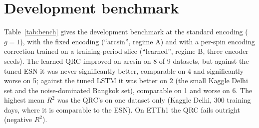 \documentclass[aps,prresearch,preprint,superscriptaddress,amsmath,amssymb,floatfix]{revtex4-2}
\begin{document}
\section{Development benchmark}\label{sec:bench}
Table~\ref{tab:bench} gives the development benchmark at the standard encoding
($g=1$), with the fixed encoding (``arcsin'', regime A) and with a per-spin encoding
correction trained on a training-period slice (``learned'', regime B, three encoder
seeds). The learned QRC improved on arcsin on 8 of 9 datasets, but against the tuned
ESN it was never significantly better, comparable on 4 and significantly worse on 5;
against the tuned LSTM it was better on 2 (the small Kaggle Delhi set and the
noise-dominated Bangkok set), comparable on 1 and worse on 6. The highest mean $R^2$
was the QRC's on one dataset only (Kaggle Delhi, 300 training days, where it is
comparable to the ESN). On ETTh1 the QRC fails outright (negative $R^2$).
\end{document}
